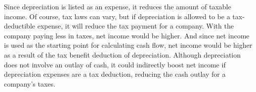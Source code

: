 \documentclass{article}
\begin{document}
{Since depreciation is listed as an expense, it reduces the amount of taxable income. Of course, tax laws can vary, but if depreciation is allowed to be a tax-deductible expense, it will reduce the tax payment for a company. With the company paying less in taxes, net income would be higher. And since net income is used as the starting point for calculating cash flow, net income would be higher as a result of the tax benefit deduction of depreciation. Although depreciation does not involve an outlay of cash, it could indirectly boost net income if depreciation expenses are a tax deduction, reducing the cash outlay for a company's taxes.  






}
\end{document}
